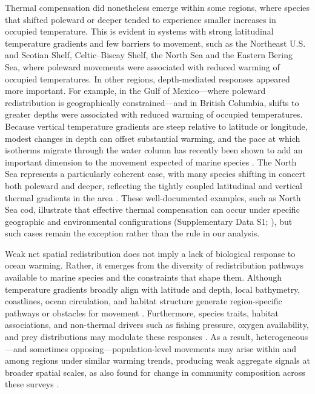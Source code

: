 \documentclass[9pt,twocolumn,twoside]{pnas-new}
\begin{document}
Thermal compensation did nonetheless emerge within some regions, where species that shifted poleward or deeper tended to experience smaller increases in occupied temperature. This is evident in systems with strong latitudinal temperature gradients and few barriers to movement, such as the Northeast U.S. and Scotian Shelf, Celtic--Biscay Shelf, the North Sea and the Eastern Bering Sea, where poleward movements were associated with reduced warming of occupied temperatures. In other regions, depth-mediated responses appeared more important. For example, in the Gulf of Mexico---where poleward redistribution is geographically constrained---and in British Columbia, shifts to greater depths were associated with reduced warming of occupied temperatures. Because vertical temperature gradients are steep relative to latitude or longitude, modest changes in depth can offset substantial warming, and the pace at which isotherms migrate through the water column has recently been shown to add an important dimension to the movement expected of marine species \citep{gruenburgVerticalClimateVelocity2025}. The North Sea represents a particularly coherent case, with many species shifting in concert both poleward and deeper, reflecting the tightly coupled latitudinal and vertical thermal gradients in the area \citep{ices_atlas_north_sea_1993}. These well-documented examples, such as North Sea cod, illustrate that effective thermal compensation can occur under specific geographic and environmental configurations (Supplementary Data S1; \citealp{perry_climate_2005, engelhard_climate_2014}), but such cases remain the exception rather than the rule in our analysis.

Weak net spatial redistribution does not imply a lack of biological response to ocean warming. Rather, it emerges from the diversity of redistribution pathways available to marine species and the constraints that shape them. Although temperature gradients broadly align with latitude and depth, local bathymetry, coastlines, ocean circulation, and habitat structure generate region-specific pathways or obstacles for movement \citep{pinsky_marine_2013, garcia_molinos_climate_2016}. Furthermore, species traits, habitat associations, and non-thermal drivers such as fishing pressure, oxygen availability, and prey distributions may modulate these responses \citep{sunday_species_2015, deutsch_climate_2015, wisz_role_2013, bandara_importance_2024}. As a result, heterogeneous---and sometimes opposing---population-level movements may arise within and among regions under similar warming trends, producing weak aggregate signals at broader spatial scales, as also found for change in community composition across these surveys \citep{kitchelMarineCommunitiesNot2025}.
\end{document}
